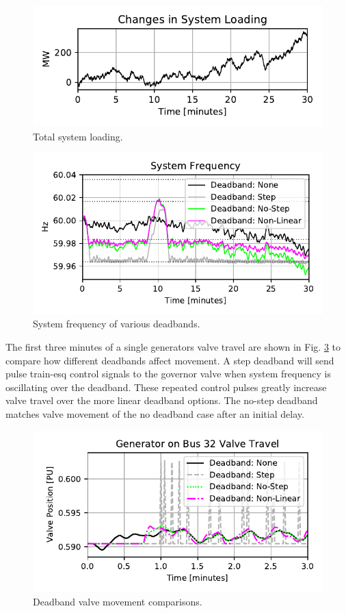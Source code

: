 \begin{figure}[!ht]
\centering
\includegraphics[width=\linewidth]{figures/miniWECCuniAccPloadChange}
\caption{Total system loading.}
\label{fig: systemLoading}
\end{figure}

\begin{figure}[!ht]
\centering
\includegraphics[width=\linewidth]{figures/miniWECCnoiseNLdroopDBFreq}
\caption{System frequency of various deadbands.}
\label{fig: sysFreqDB}
\end{figure}

The first three minutes of a single generators valve travel are shown in Fig. \ref{fig: valveComp} to compare how different deadbands affect movement.
A step deadband will send pulse train-esq control signals to the governor valve when system frequency is oscillating over the deadband. 
These repeated control pulses greatly increase valve travel over the more linear deadband options.
The no-step deadband matches valve movement of the no deadband case after an initial delay.

\begin{figure}[!ht]
\centering
\includegraphics[width=\linewidth]{figures/gen32ValveComp}
\caption{Deadband valve movement comparisons.}
\label{fig: valveComp}
\end{figure}

